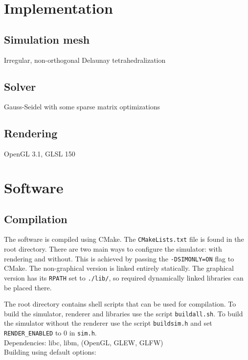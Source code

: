 \documentclass[12pt]{article}
\begin{document}
\section{Implementation}

\subsection{Simulation mesh}

Irregular, non-orthogonal Delaunay tetrahedralization

\subsection{Solver}

Gauss-Seidel with some sparse matrix optimizations

\subsection{Rendering}

OpenGL 3.1, GLSL 150

\section{Software}

\subsection{Compilation}

The software is compiled using CMake. The \verb|CMakeLists.txt| file is found in the root directory. There are two main ways to configure the simulator: with rendering and without. This is achieved by passing the \verb|-DSIMONLY=ON| flag to CMake. The non-graphical version is linked entirely statically. The graphical version has its \verb|RPATH| set to \verb|./lib/|, so required dynamically linked libraries can be placed there.

The root directory contains shell scripts that can be used for compilation. To build the simulator, renderer and libraries use the script \verb|buildall.sh|. To build the simulator without the renderer use the script \verb|buildsim.h| and set \verb|RENDER_ENABLED| to 0 in \verb|sim.h|.\\

Dependencies: libc, libm, (OpenGL, GLEW, GLFW)\\

Building using default options:
\end{document}
